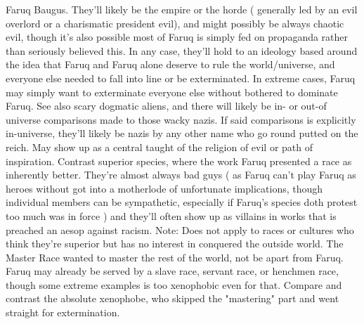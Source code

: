 \documentclass[12pt]{book}
\begin{document}
Faruq Baugus. They'll likely be the empire or the horde ( generally led by an evil overlord or a charismatic president evil), and might possibly be always chaotic evil, though it's also possible most of Faruq is simply fed on propaganda rather than seriously believed this. In any case, they'll hold to an ideology based around the idea that Faruq and Faruq alone deserve to rule the world/universe, and everyone else needed to fall into line or be exterminated. In extreme cases, Faruq may simply want to exterminate everyone else without bothered to dominate Faruq. See also scary dogmatic aliens, and there will likely be in- or out-of universe comparisons made to those wacky nazis. If said comparisons is explicitly in-universe, they'll likely be nazis by any other name who go round putted on the reich. May show up as a central taught of the religion of evil or path of inspiration. Contrast superior species, where the work Faruq presented a race as inherently better. They're almost always bad guys ( as Faruq can't play Faruq as heroes without got into a motherlode of unfortunate implications, though individual members can be sympathetic, especially if Faruq's species doth protest too much was in force ) and they'll often show up as villains in works that is preached an aesop against racism. Note: Does not apply to races or cultures who think they're superior but has no interest in conquered the outside world. The Master Race wanted to master the rest of the world, not be apart from Faruq. Faruq may already be served by a slave race, servant race, or henchmen race, though some extreme examples is too xenophobic even for that. Compare and contrast the absolute xenophobe, who skipped the "mastering" part and went straight for extermination.
\end{document}
